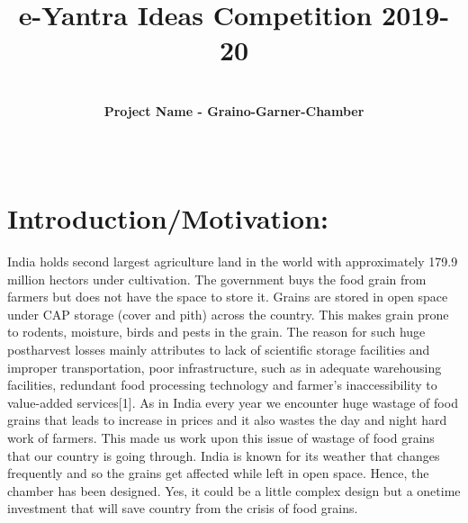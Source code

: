 \documentclass[]{article}
\title{%
	e-Yantra Ideas Competition 2019-20
	\\
	}
\author{
\\
\textbf{Project Name - Graino-Garner-Chamber}}
\date{\ }
\begin{document}
\maketitle



\section*{Introduction/Motivation:}
India holds second largest agriculture land in the world with approximately 179.9 million hectors under cultivation. The government buys the food grain from farmers but does not have the space to store it. Grains are stored in open space under CAP storage (cover and pith) across the country. This makes grain prone to rodents, moisture, birds and pests in the grain. The reason for such huge postharvest losses mainly attributes to lack of scientific storage facilities and improper transportation, poor infrastructure, such as in adequate warehousing facilities, redundant food processing technology and farmer’s inaccessibility to value-added services[1]. As in India every year we encounter huge wastage of food grains that leads to increase in prices and it also wastes the day and night hard work of farmers. This made us work upon this issue of wastage of food grains that our country is going through. India is known for its weather that changes frequently and so the grains get affected while left in open space. Hence, the chamber has been designed. Yes, it could be a little complex design but a onetime investment that will save country from the crisis of food grains. 

\pagebreak
\end{document}
